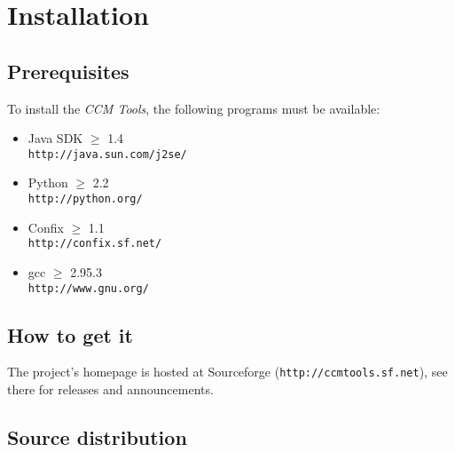 
\chapter{Installation}

\section{Prerequisites}

To install the {\it CCM Tools}, the following programs must be available:
\begin{itemize}
\item Java SDK $\ge$ 1.4 \\
{\tt http://java.sun.com/j2se/}
\item Python $\ge$ 2.2 \\
{\tt http://python.org/}
\item Confix $\ge$ 1.1 \\
{\tt http://confix.sf.net/}
\item gcc $\ge$ 2.95.3 \\
{\tt http://www.gnu.org/}
\end{itemize}

\section{How to get it}

The project's homepage is hosted at Sourceforge 
({\tt http://ccmtools.sf.net}), see there for releases and announcements.



\section{Source distribution}

